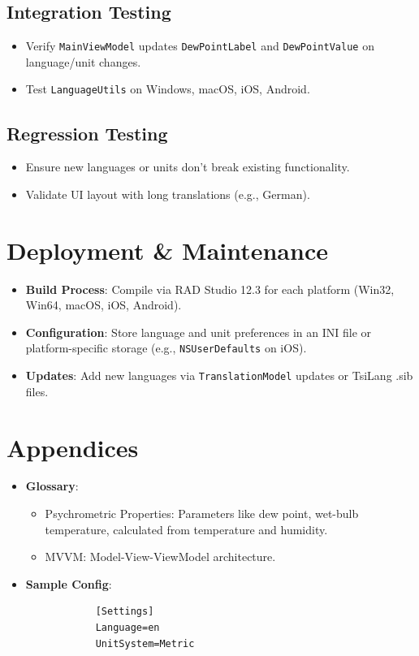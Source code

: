 \documentclass[12pt,a4paper]{article}
\begin{document}
	\subsection{Integration Testing}
	\begin{itemize}
		\item Verify \texttt{MainViewModel} updates \texttt{DewPointLabel} and \texttt{DewPointValue} on language/unit changes.
		\item Test \texttt{LanguageUtils} on Windows, macOS, iOS, Android.
	\end{itemize}
	\subsection{Regression Testing}
	\begin{itemize}
		\item Ensure new languages or units don’t break existing functionality.
		\item Validate UI layout with long translations (e.g., German).
	\end{itemize}
	
	\section{Deployment \& Maintenance}
	\begin{itemize}
		\item \textbf{Build Process}: Compile via RAD Studio 12.3 for each platform (Win32, Win64, macOS, iOS, Android).
		\item \textbf{Configuration}: Store language and unit preferences in an INI file or platform-specific storage (e.g., \texttt{NSUserDefaults} on iOS).
		\item \textbf{Updates}: Add new languages via \texttt{TranslationModel} updates or TsiLang .sib files.
	\end{itemize}
	
	\section{Appendices}
	\begin{itemize}
		\item \textbf{Glossary}:
		\begin{itemize}
			\item Psychrometric Properties: Parameters like dew point, wet-bulb temperature, calculated from temperature and humidity.
			\item MVVM: Model-View-ViewModel architecture.
		\end{itemize}
		\item \textbf{Sample Config}:
		\begin{verbatim}
			[Settings]
			Language=en
			UnitSystem=Metric
		\end{verbatim}
	\end{itemize}
	
\end{document}
